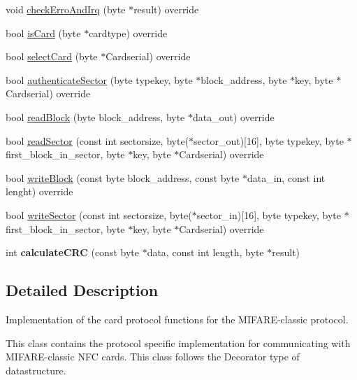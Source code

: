 \begin{DoxyCompactItemize}
\item 
void \hyperlink{class_mifare___classic_a9377d560c083320ad3b605df464a29e4}{check\+Erro\+And\+Irq} (byte $\ast$result) override
\item 
bool \hyperlink{class_mifare___classic_ae02721fc8b9268e93778fdc47d06d162}{is\+Card} (byte $\ast$cardtype) override
\item 
bool \hyperlink{class_mifare___classic_aaa549c00df8619bb2f5a96bba093f005}{select\+Card} (byte $\ast$Cardserial) override
\item 
bool \hyperlink{class_mifare___classic_a2e79d1842e44e1600f59fdfba4b22470}{authenticate\+Sector} (byte typekey, byte $\ast$block\+\_\+address, byte $\ast$key, byte $\ast$Cardserial) override
\item 
bool \hyperlink{class_mifare___classic_a6401f278760213b5c53e3c41aa5b0c98}{read\+Block} (byte block\+\_\+address, byte $\ast$data\+\_\+out) override
\item 
bool \hyperlink{class_mifare___classic_a7caca9ec9a0cdc116f8056753ecc438c}{read\+Sector} (const int sectorsize, byte($\ast$sector\+\_\+out)\mbox{[}16\mbox{]}, byte typekey, byte $\ast$first\+\_\+block\+\_\+in\+\_\+sector, byte $\ast$key, byte $\ast$Cardserial) override
\item 
bool \hyperlink{class_mifare___classic_adb793958d3f2601d336165e383a456f6}{write\+Block} (const byte block\+\_\+address, const byte $\ast$data\+\_\+in, const int lenght) override
\item 
bool \hyperlink{class_mifare___classic_a127803e07c148fe8d447a00e28be4a90}{write\+Sector} (const int sectorsize, byte($\ast$sector\+\_\+in)\mbox{[}16\mbox{]}, byte typekey, byte $\ast$first\+\_\+block\+\_\+in\+\_\+sector, byte $\ast$key, byte $\ast$Cardserial) override
\item 
int {\bfseries calculate\+C\+RC} (const byte $\ast$data, const int length, byte $\ast$result)\hypertarget{class_mifare___classic_acf3b71f86330d0bd2ba1c93f3548030a}{}\label{class_mifare___classic_acf3b71f86330d0bd2ba1c93f3548030a}

\end{DoxyCompactItemize}


\subsection{Detailed Description}
Implementation of the card protocol functions for the M\+I\+F\+A\+R\+E-\/classic protocol.

This class contains the protocol specific implementation for communicating with M\+I\+F\+A\+R\+E-\/classic N\+FC cards. This class follows the Decorator type of datastructure. 

